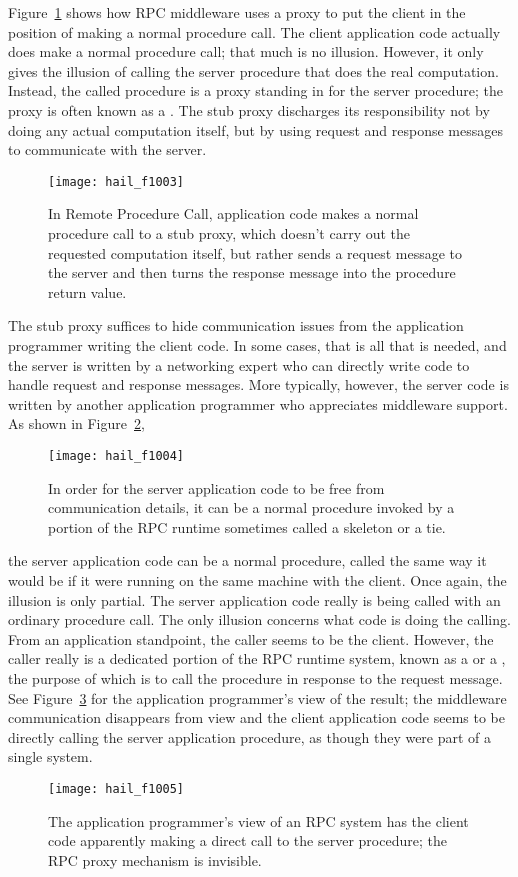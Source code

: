 Figure~\ref{scan-10-3} shows how RPC middleware uses a proxy to
put the client in the position of making a normal procedure call.  The
client application code actually does make a normal procedure call;
that much is no illusion.  However, it only gives the illusion of
calling the server procedure that does the real computation.  Instead,
the called procedure is a proxy standing in for the server procedure;
the proxy is often known as a .  The stub proxy discharges
its responsibility not by doing any actual computation itself, but by
using request and response messages to communicate with the server.
\begin{figure}
\centerline{\texttt{[image: hail\_f1003]}}
\caption{In Remote Procedure Call, application code makes a normal
  procedure call to a stub proxy, which doesn't carry out the
  requested computation itself, but rather sends a request message to
  the server and then turns the response message into the procedure
  return value.}
\label{scan-10-3}
\end{figure}

The stub proxy suffices to hide communication issues from the
application programmer writing the client code.  In some cases, that
is all that is needed, and the server is written by a networking
expert who can directly write code to handle request and response
messages.  More typically, however, the server code is written by
another application programmer who appreciates middleware support.
As shown in Figure~\ref{scan-10-4},
\begin{figure}
\centerline{\texttt{[image: hail\_f1004]}}
\caption{In order for the server application code to be free from
  communication details, it can be a normal procedure invoked by a
  portion of the RPC runtime sometimes called a skeleton or a tie.}
\label{scan-10-4}
\end{figure}
the server application code can be a
normal procedure, called the same way it would be if it were running
on the same machine with the client.  Once again, the illusion is only
partial.  The server application code really is being called with an
ordinary procedure call.  The only illusion concerns what code is
doing the calling.  From an application standpoint, the caller seems
to be the client.  However, the caller really is a dedicated portion of the
RPC runtime system, known as a  or a ,
the purpose of which is to call the procedure in response to the
request message.  See Figure~\ref{scan-10-5} for the application
programmer's view of the result; the middleware communication
disappears from view and the client application code seems to be
directly calling the server application procedure, as though they were
part of a single system.
\begin{figure}
\centerline{\texttt{[image: hail\_f1005]}}
\caption{The application programmer's view of an RPC system has the
  client code apparently making a direct call to the server procedure;
  the RPC proxy mechanism is invisible.}
\label{scan-10-5}
\end{figure}

